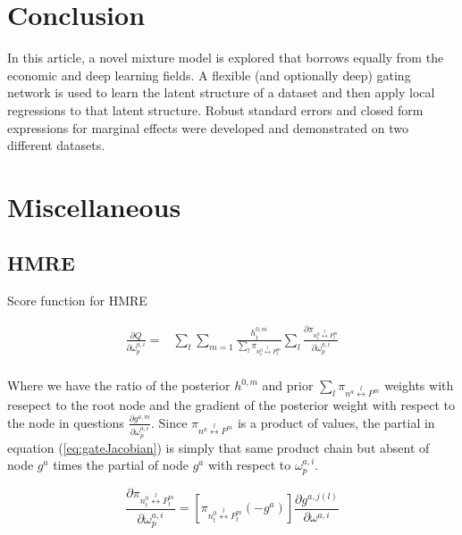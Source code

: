\documentclass[12pt]{article}
\begin{document}
\section{Conclusion} \label{sec:Conclusion}

In this article, a novel mixture model is explored that borrows equally from the
economic and deep learning fields. A flexible (and optionally deep) gating network
is used to learn the latent structure of a dataset and then apply local
regressions to that latent structure. Robust standard errors and closed form expressions
for marginal effects were developed and demonstrated on two different datasets. 


\section{Miscellaneous}


\subsection{HMRE}


Score function for HMRE

\begin{equation} \label{eq:gateJacobian}
  \begin{split}
    \frac{\partial Q}{\partial \omega^{a,i}_{p}} =& \sum_{t} \sum_{m=1}  \frac{h^{0,m}_{t}}{\sum_{l} \pi_{n^{0}_{t} \overset{l}{\longleftrightarrow} P^{m}_{t}}} \sum_{l} \frac{\partial \pi_{n^{0}_{t} \overset{l}{\longleftrightarrow} P^{m}_{t}}}{\partial \omega^{a,i}_{p}} \\
  \end{split}
\end{equation}

Where we have the ratio of the posterior $h^{0,m}$ and prior 
$\sum_{l} \pi_{n^{a} \overset{l}{\longleftrightarrow} P^{m}}$ weights with resepect
to the root node and the gradient of the posterior weight with respect to the node
in questions $\frac{\partial g^{a,m}}{\partial \omega^{a,i}_{p}}$. Since
$\pi_{n^{a} \overset{l}{\longleftrightarrow} P^{m}}$ is a product of values, the
partial in equation (\ref{eq:gateJacobian}) is simply that same product chain but
absent of node $g^a$ times the partial of node $g^a$ with respect to
$\omega^{a,i}_{p}$.

\begin{equation} \label{eq:gatechainpartial}
  \frac{\partial \pi_{n^{0}_{t} \overset{l}{\longleftrightarrow} P^{m}_{t}}}{\partial \omega^{a,i}_{p}} = [\pi_{n^{0}_{t} \overset{l}{\longleftrightarrow} P^{m}_{t}} (-g^{a})] \frac{\partial g^{a, j(l)}}{\partial \omega^{a, i}}
\end{equation}
\end{document}
